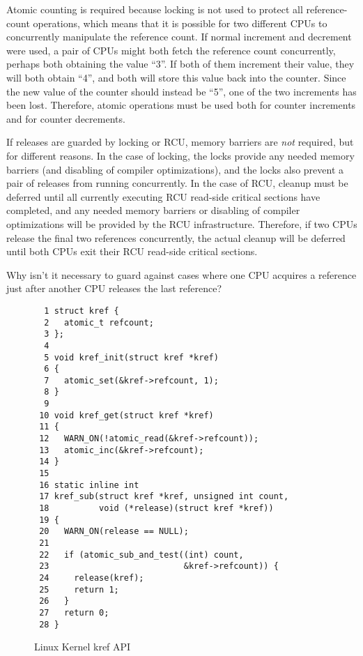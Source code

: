 Atomic counting is required
because locking is not used to protect all reference-count operations,
which means that it is possible for two different CPUs to concurrently
manipulate the reference count.
If normal increment and decrement were used, a pair of CPUs might both
fetch the reference count concurrently, perhaps both obtaining
the value ``3''.
If both of them increment their value, they will both obtain ``4'',
and both will store this value back into the counter.
Since the new value of the counter should instead be ``5'', one
of the two increments has been lost.
Therefore, atomic operations must be used both for counter increments
and for counter decrements.

If releases are guarded by locking or RCU,
memory barriers are \emph{not} required, but for different reasons.
In the case of locking, the locks provide any needed memory barriers
(and disabling of compiler optimizations), and the locks also
prevent a pair of releases from running concurrently.
In the case of RCU, cleanup must be deferred until all currently
executing RCU read-side critical sections have completed, and
any needed memory barriers or disabling of compiler optimizations
will be provided by the RCU infrastructure.
Therefore, if two CPUs release the final two references concurrently,
the actual cleanup will be deferred until both CPUs exit their
RCU read-side critical sections.

\QuickQuiz{}
	Why isn't it necessary to guard against cases where one CPU
	acquires a reference just after another CPU releases the last
	reference?
 \QuickQuizEnd

\begin{figure}[htbp]
{ \scriptsize
\begin{verbatim}
  1 struct kref {
  2   atomic_t refcount;
  3 };
  4 
  5 void kref_init(struct kref *kref)
  6 {
  7   atomic_set(&kref->refcount, 1);
  8 }
  9 
 10 void kref_get(struct kref *kref)
 11 {
 12   WARN_ON(!atomic_read(&kref->refcount));
 13   atomic_inc(&kref->refcount);
 14 }
 15 
 16 static inline int
 17 kref_sub(struct kref *kref, unsigned int count,
 18          void (*release)(struct kref *kref))
 19 {
 20   WARN_ON(release == NULL);
 21 
 22   if (atomic_sub_and_test((int) count,
 23                           &kref->refcount)) {
 24     release(kref);
 25     return 1;
 26   }
 27   return 0;
 28 }
\end{verbatim}
}
\caption{Linux Kernel kref API}
\label{fig:defer:Linux Kernel kref API}
\end{figure}

